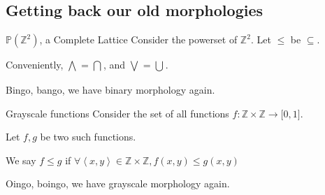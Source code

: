 \documentclass{beamer}
\newcommand{\tuple}[1]{\left\langle #1 \right\rangle}
\newcommand{\bigintersect}[1]{\displaystyle\bigcap_{#1}}
\newcommand{\bigunion}[1]{\displaystyle\bigcup_{#1}}
\newcommand{\power}[1]{\mathbb{P}\left(#1\right)}
\newcommand{\integers}{\mathbb{Z}}
\newcommand{\coords}{\integers \times \integers}
\newcommand{\func}[3]{#1:#2\rightarrow#3}
\newcommand{\meet}[1]{\bigwedge_{#1}}
\newcommand{\join}[1]{\bigvee_{#1}}
\newcommand{\partialless}{\leqslant}
\begin{document}
\subsection{Getting back our old morphologies}

\begin{frame}{$\power{\integers^2}$, a Complete Lattice}
Consider the powerset of $\integers^2$.
Let $\partialless$ be $\subseteq$.

Conveniently, $\meet{} = \bigintersect{}$, and $\join{} = \bigunion{}$.

Bingo, bango, we have binary morphology again.
\end{frame}

\begin{frame}{Grayscale functions}
Consider the set of all functions $\func{f}{\coords}{\lbrack 0,1 \rbrack}$.

Let $f,g$ be two such functions.

We say $f \partialless g$ if 
$\forall \tuple{x,y} \in \coords, f(x,y) \leq g(x,y)$

Oingo, boingo, we have grayscale morphology again.


\end{frame}
\end{document}
